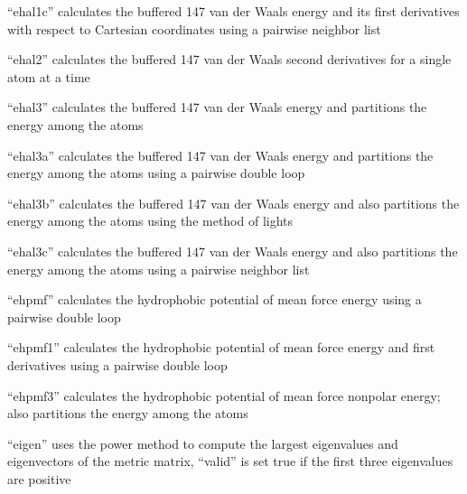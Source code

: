 \documentclass[letterpaper,11pt,english]{sphinxmanual}
\begin{document}

“ehal1c” calculates the buffered 14\sphinxhyphen{}7 van der Waals energy and
its first derivatives with respect to Cartesian coordinates
using a pairwise neighbor list


“ehal2” calculates the buffered 14\sphinxhyphen{}7 van der Waals second
derivatives for a single atom at a time


“ehal3” calculates the buffered 14\sphinxhyphen{}7 van der Waals energy
and partitions the energy among the atoms


“ehal3a” calculates the buffered 14\sphinxhyphen{}7 van der Waals energy
and partitions the energy among the atoms using a pairwise
double loop


“ehal3b” calculates the buffered 14\sphinxhyphen{}7 van der Waals energy
and also partitions the energy among the atoms using the
method of lights


“ehal3c” calculates the buffered 14\sphinxhyphen{}7 van der Waals energy
and also partitions the energy among the atoms using a
pairwise neighbor list


“ehpmf” calculates the hydrophobic potential of mean force
energy using a pairwise double loop


“ehpmf1” calculates the hydrophobic potential of mean force
energy and first derivatives using a pairwise double loop


“ehpmf3” calculates the hydrophobic potential of mean force
nonpolar energy; also partitions the energy among the atoms


“eigen” uses the power method to compute the largest eigenvalues
and eigenvectors of the metric matrix, “valid” is set true if the
first three eigenvalues are positive

\end{document}
